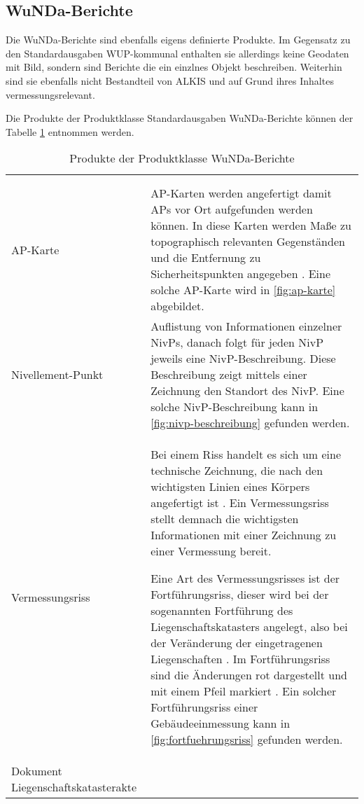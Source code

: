 \subsection{WuNDa-Berichte}
Die WuNDa-Berichte sind ebenfalls eigens definierte Produkte. Im Gegensatz zu den Standardausgaben WUP-kommunal enthalten sie allerdings keine Geodaten mit Bild, sondern sind Berichte die ein einzlnes Objekt beschreiben. Weiterhin sind sie ebenfalls nicht Bestandteil von ALKIS und auf Grund ihres Inhaltes vermessungsrelevant.

Die Produkte der Produktklasse Standardausgaben WuNDa-Berichte können der Tabelle \ref{tab-wunda-berichte} entnommen werden.
\begin{longtable}{|p{}|p{}|}	
	\caption{Produkte der Produktklasse WuNDa-Berichte} \label{tab-wunda-berichte} \\
	\hline 
	\head{Produktname}  & \head{Beschreibung} \tabularnewline
	\hline 
	\endfirsthead
	\caption{Produkte der Produktklasse WuNDa-Berichte} \\
	\hline 
	\head{Produktname}  & \head{Beschreibung} \tabularnewline
	\hline 
	\endhead
	AP-Karte
	&
	AP-Karten werden angefertigt damit \acfp{AP} vor Ort aufgefunden werden können. In diese Karten werden Maße zu topographisch relevanten Gegenständen und die Entfernung zu Sicherheitspunkten angegeben \autocite[vgl.][]{siegen-ap-karte}. Eine solche AP-Karte wird in \vref{fig:ap-karte} abgebildet.
	 \\
	\hline
	Nivellement-Punkt
	&
	Auflistung von Informationen einzelner \acfp{NivP}, danach folgt für jeden NivP jeweils eine NivP-Beschreibung. Diese Beschreibung zeigt mittels einer Zeichnung den Standort des NivP. Eine solche NivP-Beschreibung kann in \ref{fig:nivp-beschreibung} gefunden werden.  \\
	\hline
	Vermessungsriss
	&
	Bei einem Riss handelt es sich um eine technische Zeichnung, die nach den wichtigsten Linien eines Körpers angefertigt ist \autocite[vgl.][]{duden-riss}. Ein Vermessungsriss stellt demnach die wichtigsten Informationen mit einer Zeichnung zu einer Vermessung bereit.
	
	Eine Art des Vermessungsrisses ist der Fortführungsriss, dieser wird bei der sogenannten Fortführung des Liegenschaftskatasters angelegt, also bei der Veränderung der eingetragenen Liegenschaften \autocite[vgl.][]{vermpedia-fortfuehrung}.
	Im Fortführungsriss sind die Änderungen rot dargestellt und mit einem Pfeil markiert \autocite[vgl.][]{stelling-fortfuehrung}. Ein solcher Fortführungsriss einer Gebäudeeinmessung kann in \ref{fig:fortfuehrungsriss} gefunden werden.
	 \\
	\hline
	Dokument Liegenschaftskatasterakte
	&
	\todo{Was ist das?} \\
	\hline
\end{longtable} 
	
